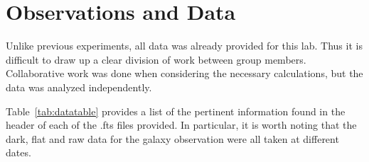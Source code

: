 \documentclass[a4paper,12pt]{article}
\begin{document}

\section{Observations and Data}
\label{sec:obs}

Unlike previous experiments, all data was already provided for this lab. Thus it is difficult to draw up a clear division of work between group members. Collaborative work was done when considering the necessary calculations, but the data was analyzed independently.

Table~\ref{tab:datatable} provides a list of the pertinent information found in the header of each of the .fts files provided. In particular, it is worth noting that the dark, flat and raw data for the galaxy observation were all taken at different dates.
\end{document}
